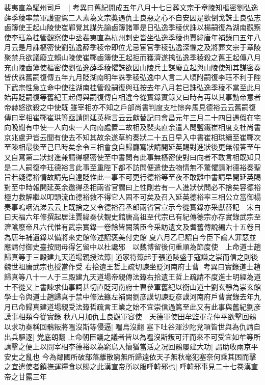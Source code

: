 裴夷直為驩州司戶　|{
	考異曰舊紀開成五年八月十七日葬文宗于章陵知樞密劉弘逸薛季稜率禁軍護靈駕二人素為文宗奬遇仇士良惡之心不自安因是欲倒戈誅士良弘志鹵簿使王起山陵使崔鄲覺其謀先諭鹵簿諸軍是日弘逸季稜伏誅以楊嗣復為湖南觀察使李珏為桂管觀察使中丞裴夷直為杭州刺史皆坐弘逸季稜也賈緯唐年補錄曰五年八月云是月誅樞密使劉弘逸薛季稜帝即位尤忌宦官季稜弘逸深懼之及將葬文宗于章陵聚禁兵欲議廢立賴山陵使崔鄲鹵簿使王起拒而獲濟遂擒弘逸季稜殺之舊王起傳八月充山陵鹵簿使樞密使劉弘逸薛季稜懼誅欲因山陵兵士謀廢立起與山陵使知其謀密奏皆伏誅舊嗣復傳五年九月貶湖南明年誅季稜弘逸中人言二人頃附嗣復李珏不利于陛下武宗性急立命中使往湖南桂管殺嗣復與珏按去年八月若已誅弘逸季稜不當至此月始再貶嗣復等舊紀王起傳與嗣復傳自相違今從實錄實錄又曰時有再以其事動帝意者帝赫怒欲殺之中使既雖宰相亦不知之戶部尚書判度支杜悰奔馬見德裕云云舊嗣復傳曰宰相崔鄲崔珙等亟請開延英極言云云獻替記曰會昌元年三月二十四日遇假在宅向晚聞有中使一人向東一人向南處置二故相及裴夷直余遣人問鹽鐵崔相度支杜尚書京兆盧尹皆云聞有使去不知其故余遂草約奏狀二十五日早入中書崔相珙續至崔鄲次至陳相最後至己巳時矣余令三相會食自歸廳寫狀請開延英賜對進狀後更無報答至午又自寫第二狀封進兼請得樞密使至中書問有此事無樞密使對曰向者不敢言相既知只是二人嗣復李珏德裕言此事至重陛下都不訪問便遣使去物情無不驚懼請附德裕奏聖旨若疑德裕情故請先自遠貶惟此一事不可更行德裕等至夜不敢離中書請早開延英賜對至中時報開延英余邀得丞相兩省官謂曰上性剛若有一人進狀伏問必不捨矣容德裕極力救解繼以叩頭流血德裕救不得它人固不可矣及召入延英德裕率三相公立當御榻奏事嗚咽流涕云云上既捨之又令德裕召丞郎兩省官宣示今從實錄亦采獻替記　宋白曰天福六年修撰起居注賈緯奏伏覩史館唐高祖至代宗已有紀傳德宗亦存實錄武宗至濟隂廢帝凡六代惟有武宗實錄一卷餘皆闕落臣今采訪遺文及耆舊傳說編六十五卷目為唐年補遺錄以備將來史館修述詔褒美付史館}
夏六月乙巳詔自今臣下論人罪惡並應請付御史臺按問毋得乞留中以杜讒邪　以魏博留後何重順為節度使　上命道士趙歸真等于三殿建九天道場親授法籙|{
	道家符籙起于張道陵盛于寇謙之崇而信之則後魏世祖唐武宗也授當作受}
右拾遺王哲上疏切諫坐貶河南府士曹|{
	考異曰實錄道士趙歸真等八十一人于三殿建九天道場帝親傳法籙右拾遺王哲上疏請不度進士明經為道士不從又上書諫求仙事詞甚切直貶河南府士曹參軍舊紀以衡山道士劉玄靜為崇玄館學士令與道士趙歸真于禁中修法籙左補闕劉彦謨切諫貶彦謨河南府戶曹實錄去年九月已命歸真建道場親受法籙哲疏言王業之始不宜崇信過篤至此又有此事與舊紀劉彦謨事相類今從實錄}
秋八月加仇士良觀軍容使　天德軍使田牟監軍韋仲平欲擊回鶻以求功奏稱回鶻叛將嗢沒斯等侵逼|{
	嗢烏沒翻}
塞下吐谷渾沙陀党項皆世與為仇請自出兵驅逐|{
	党底朗翻}
上命朝臣議之議者皆以為嗢沒斯叛可汗而來不可受宜如牟等所請擊之便上以問宰相李德裕以為窮鳥入懷猶當活之况回鶻屢建大功|{
	謂助收兩京平安史之亂也}
今為鄰國所破部落離散窮無所歸遠依天子無秋毫犯塞奈何乘其困而擊之宜遣使者鎮撫運糧食以賜之此漢宣帝所以服呼韓邪也|{
	呼韓邪事見二十七卷漢宣帝之甘露三年}
